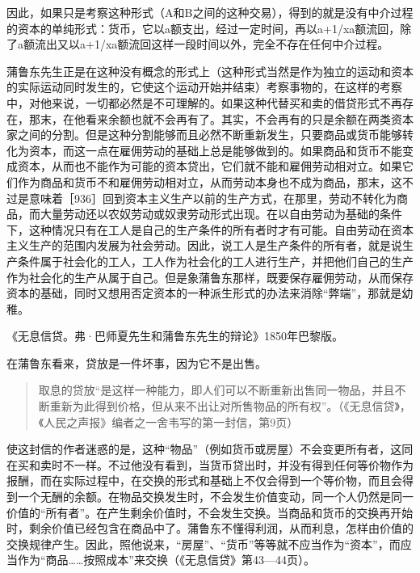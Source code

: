 因此，如果只是考察这种形式（A和B之间的这种交易），得到的就是没有中介过程的资本的单纯形式：货币，它以a额支出，经过一定时间，再以a+1/xa额流回，除了a额流出又以a+1/xa额流回这样一段时间以外，完全不存在任何中介过程。

蒲鲁东先生正是在这种没有概念的形式上（这种形式当然是作为独立的运动和资本的实际运动同时发生的，它使这个运动开始并结束）考察事物的，在这样的考察中，对他来说，一切都必然是不可理解的。如果这种代替买和卖的借贷形式不再存在，那末，在他看来余额也就不会再有了。其实，不会再有的只是余额在两类资本家之间的分割。但是这种分割能够而且必然不断重新发生，只要商品或货币能够转化为资本，而这一点在雇佣劳动的基础上总是能够做到的。如果商品和货币不能变成资本，从而也不能作为可能的资本贷出，它们就不能和雇佣劳动相对立。如果它们作为商品和货币不和雇佣劳动相对立，从而劳动本身也不成为商品，那末，这不过是意味着［936］回到资本主义生产以前的生产方式，在那里，劳动不转化为商品，而大量劳动还以农奴劳动或奴隶劳动形式出现。在以自由劳动为基础的条件下，这种情况只有在工人是自己的生产条件的所有者时才有可能。自由劳动在资本主义生产的范围内发展为社会劳动。因此，说工人是生产条件的所有者，就是说生产条件属于社会化的工人，工人作为社会化的工人进行生产，并把他们自己的生产作为社会化的生产从属于自己。但是象蒲鲁东那样，既要保存雇佣劳动，从而保存资本的基础，同时又想用否定资本的一种派生形式的办法来消除“弊端”，那就是幼稚。

《无息信贷。弗·巴师夏先生和蒲鲁东先生的辩论》1850年巴黎版。

在蒲鲁东看来，贷放是一件坏事，因为它不是出售。

\begin{quote}{取息的贷放“是这样一种能力，即人们可以不断重新出售同一物品，并且不断重新为此得到价格，但从来不出让对所售物品的所有权”。（《无息信贷》，《人民之声报》编者之一舍韦写的第一封信，第9页）}\end{quote}

使这封信的作者迷惑的是，这种“物品”（例如货币或房屋）不会变更所有者，这同在买和卖时不一样。不过他没有看到，当货币贷出时，并没有得到任何等价物作为报酬，而在实际过程中，在交换的形式和基础上不仅会得到一个等价物，而且会得到一个无酬的余额。在物品交换发生时，不会发生价值变动，同一个人仍然是同一价值的“所有者”。在产生剩余价值时，不会发生交换。当商品和货币的交换再开始时，剩余价值已经包含在商品中了。蒲鲁东不懂得利润，从而利息，怎样由价值的交换规律产生。因此，照他说来，“房屋”、“货币”等等就不应当作为“资本”，而应当作为“商品……按照成本”来交换（《无息信贷》第43—44页）。

